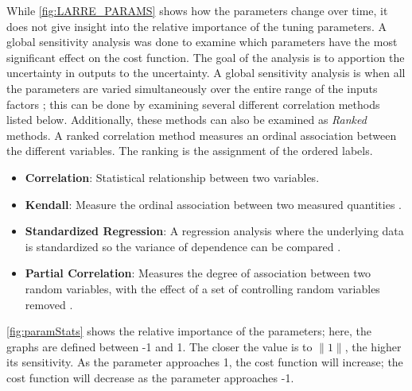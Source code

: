 While \autoref{fig:LARRE_PARAMS} shows how the parameters change over time, it does not give insight into the relative importance of the tuning parameters. A global sensitivity analysis was done to examine which parameters have the most significant effect on the cost function. The goal of the analysis is to apportion the uncertainty in outputs to the uncertainty. A global sensitivity analysis is when all the parameters are varied simultaneously over the entire range of the inputs factors \cite{saltelli2008global}; this can be done by examining several different correlation methods listed below. Additionally, these methods can also be examined as \textit{Ranked} methods. A ranked correlation method measures an ordinal association between the different variables. The ranking is the assignment of the ordered labels. 

\begin{itemize}
    \item \textbf{Correlation}: Statistical relationship between two variables. 
    \item \textbf{Kendall}: Measure the ordinal association between two measured quantities \cite{abdi2007kendall}.
    \item \textbf{Standardized Regression}: A regression analysis where the underlying data is standardized so the variance of dependence can be compared \cite{SIEGEL2016355}.  
    \item \textbf{Partial Correlation}: Measures the degree of association between two random variables, with the effect of a set of controlling random variables removed \cite{PARTIALCORRELATION}. 
\end{itemize}




\autoref{fig:paramStats} shows the relative importance of the parameters; here, the graphs are defined between -1 and 1. The closer the value is to $\|1\|$, the higher its sensitivity. As the parameter approaches 1, the cost function will increase; the cost function will decrease as the parameter approaches -1. 

